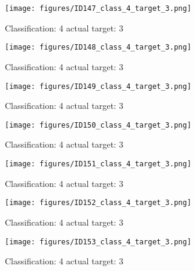 \begin{figure}[h!]
\begin{center}
\texttt{[image: figures/ID147\_class\_4\_target\_3.png]}
\end{center}
\caption{ Classification: 4 actual target: 3}
\label{fig:ID147_class_4_target_3}
\end{figure}
\begin{figure}[h!]
\begin{center}
\texttt{[image: figures/ID148\_class\_4\_target\_3.png]}
\end{center}
\caption{ Classification: 4 actual target: 3}
\label{fig:ID148_class_4_target_3}
\end{figure}
\begin{figure}[h!]
\begin{center}
\texttt{[image: figures/ID149\_class\_4\_target\_3.png]}
\end{center}
\caption{ Classification: 4 actual target: 3}
\label{fig:ID149_class_4_target_3}
\end{figure}
\begin{figure}[h!]
\begin{center}
\texttt{[image: figures/ID150\_class\_4\_target\_3.png]}
\end{center}
\caption{ Classification: 4 actual target: 3}
\label{fig:ID150_class_4_target_3}
\end{figure}
\begin{figure}[h!]
\begin{center}
\texttt{[image: figures/ID151\_class\_4\_target\_3.png]}
\end{center}
\caption{ Classification: 4 actual target: 3}
\label{fig:ID151_class_4_target_3}
\end{figure}
\begin{figure}[h!]
\begin{center}
\texttt{[image: figures/ID152\_class\_4\_target\_3.png]}
\end{center}
\caption{ Classification: 4 actual target: 3}
\label{fig:ID152_class_4_target_3}
\end{figure}
\begin{figure}[h!]
\begin{center}
\texttt{[image: figures/ID153\_class\_4\_target\_3.png]}
\end{center}
\caption{ Classification: 4 actual target: 3}
\label{fig:ID153_class_4_target_3}
\end{figure}
